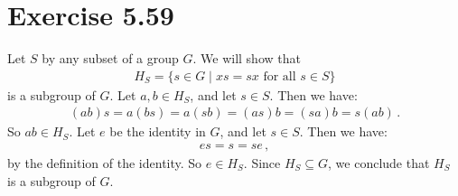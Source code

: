 \documentclass{article}
\begin{document}
\qedsymbol

\section*{Exercise 5.59}

Let $S$ by any subset of a group $G$.
We will show that
\begin{align*}
    H_S = \{s \in G \;\vert\; xs = sx \text{ for all } s \in S \}
\end{align*}
is a subgroup of $G$. Let $a, b \in H_S$, and let $s \in S$.
Then we have:
\begin{align*}
    (ab)s = a(bs) = a(sb) = (as)b = (sa)b = s(ab) \,.
\end{align*}
So $ab \in H_S$. Let $e$ be the identity in $G$, and let $s \in S$.
Then we have:
\begin{align*}
    es = s = se \,,
\end{align*}
by the definition of the identity. So $e \in H_S$. Since $H_S \subseteq G$,
we conclude that $H_S$ is a subgroup of $G$.

\qedsymbol
\end{document}
